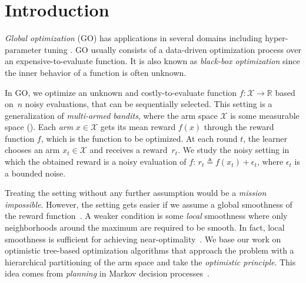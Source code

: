 \section{Introduction}\label{sec:gpo.intro}

\textit{Global optimization} (GO)
has applications in several domains including hyper-parameter tuning \citep{jamieson2016hyperband, li2017hyperband,samothrakis2013}.  GO usually consists of a data-driven optimization process over an expensive-to-evaluate function. It is also known as \emph{black-box optimization} since the inner behavior of a function is often unknown.

In GO, we optimize an unknown and costly-to-evaluate function $f: \mathcal{X} \rightarrow \mathbb{R}$ based on~$n$ noisy evaluations, that can be sequentially selected. This setting is a generalization of \textit{multi-armed bandits}, where the arm space $\mathcal{X}$ is some measurable space (\citealt{bubeck2011pure}). Each \emph{arm} $x \in \mathcal{X}$ gets its mean reward $f(x)$ through the reward function $f$, which is  the function to be optimized. At each round $t$, the learner chooses an arm $x_t \in \mathcal{X}$ and receives a reward~$r_t$. We study the noisy setting in which the obtained reward is a noisy evaluation of $f$: $r_t \triangleq f(x_t) + \epsilon_t$, where $\epsilon_t$ is a bounded noise.

Treating the setting without any further assumption would be a \emph{mission impossible}. However, the setting gets easier if we assume a global smoothness of the reward function~\citep{agrawal1995continuum,kleinberg2004nearly,kleinberg2008multi,cope2009,auer2007improved,slivkins2011taxonomy,kleinberg2013}. A weaker condition is some \emph{local} smoothness where only neighborhoods around the maximum are required to be smooth.  In fact, local smoothness is sufficient for achieving near-optimality~\citep{valko2013stosoo,azar2014online,grill2015poo,bull2015adaptive}.
We base our work on optimistic tree-based optimization algorithms \citep{munos2011soo,valko2013stosoo,preux2014bandits,azar2014online} that approach the problem with a hierarchical partitioning of the arm space and take the \textit{optimistic principle}. This idea comes from \textit{planning} in Markov decision processes~\citep{kocsis2006bandit,munos2014,grill2016trail}.

